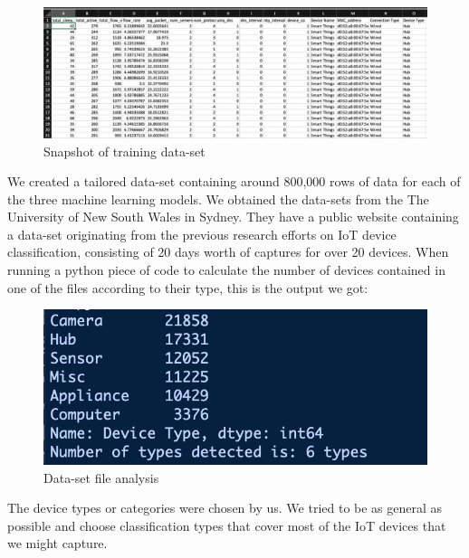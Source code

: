 \documentclass{article}
\begin{document}
\begin{figure}[!ht]
    \centering
    \includegraphics[width=13cm]{MLgraphs/Snapshotoftrainingdataset.png}
    \caption{Snapshot of training data-set} 
\end{figure}


We created a tailored data-set containing around 800,000 rows of data for each of the three machine learning models. We obtained the data-sets from the The University of New South Wales in Sydney. They have a public website \cite{ACMSOSR} containing a data-set originating from the previous research efforts on IoT device classification, consisting of 20 days worth of captures for over 20 devices. When running a python piece of code to calculate the number of devices contained in one of the files according to their type, this is the output we got:\newline

\begin{figure}[!ht]
    \centering
    \includegraphics[scale=0.75]{MLgraphs/Datasetfileanalysis.png}
    \caption{Data-set file analysis} 
\end{figure}
\pagebreak
The device types or categories were chosen by us. We tried to be as general as possible and choose classification types that cover most of the IoT devices that we might capture.\newline
\end{document}
